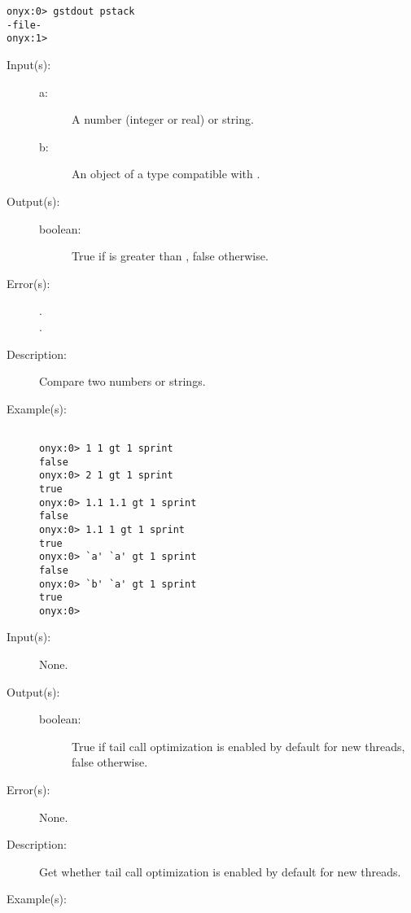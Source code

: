 \begin{description}
\begin{description}
\begin{verbatim}
onyx:0> gstdout pstack
-file-
onyx:1>
		\end{verbatim}
	\end{description}
\label{systemdict:gt}
\item[{\onyxop{a b}{gt}{boolean}}: ]
	\begin{description}\item[]
	\item[Input(s): ]
		\begin{description}\item[]
		\item[a: ]
			A number (integer or real) or string.
		\item[b: ]
			An object of a type compatible with .
		\end{description}
	\item[Output(s): ]
		\begin{description}\item[]
		\item[boolean: ]
			True if  is greater than , false
			otherwise.
		\end{description}
	\item[Error(s): ]
		\begin{description}\item[]
		\item[.]
		\item[.]
		\end{description}
	\item[Description: ]
		Compare two numbers or strings.
	\item[Example(s): ]\begin{verbatim}

onyx:0> 1 1 gt 1 sprint
false
onyx:0> 2 1 gt 1 sprint
true
onyx:0> 1.1 1.1 gt 1 sprint
false
onyx:0> 1.1 1 gt 1 sprint
true
onyx:0> `a' `a' gt 1 sprint
false
onyx:0> `b' `a' gt 1 sprint
true
onyx:0>
		\end{verbatim}
	\end{description}
\label{systemdict:gtailopt}
\item[{\onyxop{--}{gtailopt}{boolean}}: ]
	\begin{description}\item[]
	\item[Input(s): ] None.
	\item[Output(s): ]
		\begin{description}\item[]
		\item[boolean: ]
			True if tail call optimization is enabled by default for
			new threads, false otherwise.
		\end{description}
	\item[Error(s): ] None.
	\item[Description: ]
		Get whether tail call optimization is enabled by default for new
		threads.
	\item[Example(s): ]\begin{verbatim}


\end{verbatim}
\end{description}
\end{description}
